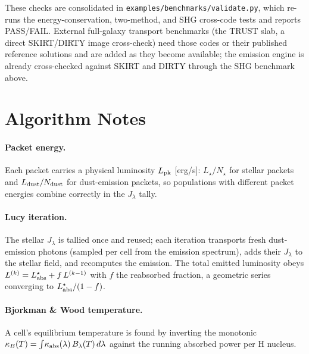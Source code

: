 \documentclass[english,a4paper]{kiseon_memo}
\newcommand{\file}[1]{\texttt{#1}}
\begin{document}
These checks are consolidated in \file{examples/benchmarks/validate.py}, which
re-runs the energy-conservation, two-method, and SHG cross-code tests and reports
PASS/FAIL.  External full-galaxy transport benchmarks (the TRUST slab, a direct
\textsc{SKIRT}/\textsc{DIRTY} image cross-check) need those codes or their
published reference solutions and are added as they become available; the
emission engine is already cross-checked against \textsc{SKIRT} and
\textsc{DIRTY} through the SHG benchmark above.

\section{Algorithm Notes}
\paragraph{Packet energy.}  Each packet carries a physical luminosity
$L_{\rm pk}$ [erg/s]: $L_\star/N_\star$ for stellar packets and
$L_{\rm dust}/N_{\rm dust}$ for dust-emission packets, so populations with
different packet energies combine correctly in the $J_\lambda$ tally.

\paragraph{Lucy iteration.}  The stellar $J_\lambda$ is tallied once and
reused; each iteration transports fresh dust-emission photons (sampled per cell
from the emission spectrum), adds their $J_\lambda$ to the stellar field, and
recomputes the emission.  The total emitted luminosity obeys
$L^{(k)}=L_{\rm abs}^\star + f\,L^{(k-1)}$ with $f$ the reabsorbed fraction, a
geometric series converging to $L_{\rm abs}^\star/(1-f)$.

\paragraph{Bjorkman \& Wood temperature.}  A cell's equilibrium temperature is
found by inverting the monotonic
$\kappa_B(T)=\int\!\kappa_{\rm abs}(\lambda)\,B_\lambda(T)\,d\lambda$ against
the running absorbed power per H nucleus.

\end{document}
